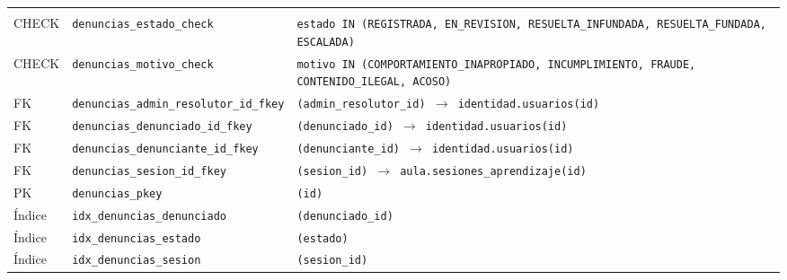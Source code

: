 {\small
\begin{xltabular}{\textwidth}{@{}>{\raggedright\arraybackslash}p{1.7cm} >{\raggedright\arraybackslash}p{4.6cm} L@{}}
    \toprule
     &  &  \\
    \midrule
    \endfirsthead
    \toprule
     &  &  \\
    \midrule
    \endhead
    \bottomrule
    \endfoot
    CHECK & \texttt{denuncias\_\allowbreak{}estado\_\allowbreak{}check} & \texttt{estado IN (\allowbreak{}\textquotesingle{}REGISTRADA\textquotesingle{},\allowbreak{} \textquotesingle{}EN\_\allowbreak{}REVISION\textquotesingle{},\allowbreak{} \textquotesingle{}RESUELTA\_\allowbreak{}INFUNDADA\textquotesingle{},\allowbreak{} \textquotesingle{}RESUELTA\_\allowbreak{}FUNDADA\textquotesingle{},\allowbreak{} \textquotesingle{}ESCALADA\textquotesingle{})} \\
    CHECK & \texttt{denuncias\_\allowbreak{}motivo\_\allowbreak{}check} & \texttt{motivo IN (\allowbreak{}\textquotesingle{}COMPORTAMIENTO\_\allowbreak{}INAPROPIADO\textquotesingle{},\allowbreak{} \textquotesingle{}INCUMPLIMIENTO\textquotesingle{},\allowbreak{} \textquotesingle{}FRAUDE\textquotesingle{},\allowbreak{} \textquotesingle{}CONTENIDO\_\allowbreak{}ILEGAL\textquotesingle{},\allowbreak{} \textquotesingle{}ACOSO\textquotesingle{})} \\
    FK & \texttt{denuncias\_\allowbreak{}admin\_\allowbreak{}resolutor\_\allowbreak{}id\_\allowbreak{}fkey} & \texttt{(\allowbreak{}admin\_\allowbreak{}resolutor\_\allowbreak{}id) $\rightarrow$ identidad.usuarios(\allowbreak{}id)} \\
    FK & \texttt{denuncias\_\allowbreak{}denunciado\_\allowbreak{}id\_\allowbreak{}fkey} & \texttt{(\allowbreak{}denunciado\_\allowbreak{}id) $\rightarrow$ identidad.usuarios(\allowbreak{}id)} \\
    FK & \texttt{denuncias\_\allowbreak{}denunciante\_\allowbreak{}id\_\allowbreak{}fkey} & \texttt{(\allowbreak{}denunciante\_\allowbreak{}id) $\rightarrow$ identidad.usuarios(\allowbreak{}id)} \\
    FK & \texttt{denuncias\_\allowbreak{}sesion\_\allowbreak{}id\_\allowbreak{}fkey} & \texttt{(\allowbreak{}sesion\_\allowbreak{}id) $\rightarrow$ aula.sesiones\_\allowbreak{}aprendizaje(\allowbreak{}id)} \\
    PK & \texttt{denuncias\_\allowbreak{}pkey} & \texttt{(\allowbreak{}id)} \\
    Índice & \texttt{idx\_\allowbreak{}denuncias\_\allowbreak{}denunciado} & \texttt{(\allowbreak{}denunciado\_\allowbreak{}id)} \\
    Índice & \texttt{idx\_\allowbreak{}denuncias\_\allowbreak{}estado} & \texttt{(\allowbreak{}estado)} \\
    Índice & \texttt{idx\_\allowbreak{}denuncias\_\allowbreak{}sesion} & \texttt{(\allowbreak{}sesion\_\allowbreak{}id)} \\
\end{xltabular}
}

